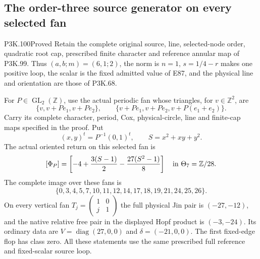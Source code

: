 \subsection{The order-three source generator on every selected fan}
\begin{statement}{P3K.100}{Proved}
Retain the complete original source, line, selected-node order,
quadratic root cap, prescribed finite character and reference annular map
of P3K.99. Thus \((a,b;m)=(6,1;2)\), the norm is \(n=1\),
\(s=1/4-r\) makes one positive loop, the scalar is the fixed admitted
value of E87, and the physical line and orientation are those of P3K.68.

For \(P\in\operatorname{GL}_2(\mathbb Z)\), use the actual periodic fan
whose triangles, for \(v\in\mathbb Z^2\), are
\[
 \{v,v+Pe_1,v+Pe_2\},\qquad
 \{v+Pe_1,v+Pe_2,v+P(e_1+e_2)\}.
\]
Carry its complete character, period, Cox, physical-circle, line and
finite-cap maps specified in the proof. Put
\[
 (x,y)^t=P^{-1}(0,1)^t,\qquad S=x^2+xy+y^2.
\]
The actual oriented return on this selected fan is
\[
 [\Phi_P]=\left[-4+\frac{3(S-1)}2-\frac{27(S^2-1)}8\right]
       \quad\hbox{in }\Theta_7=\mathbb Z/28.
\]
The complete image over these fans is
\[
 \{0,3,4,5,7,10,11,12,14,17,18,19,21,24,25,26\}.
\]
On every vertical fan \(T_j=\left(\begin{smallmatrix}1&0\\j&1\end{smallmatrix}\right)\)
the full physical Jin pair is \((-27,-12)\), and the native relative
free pair in the displayed Hopf product is \((-3,-24)\). Its ordinary
data are \(V=\operatorname{diag}(27,0,0)\) and
\(\delta=(-21,0,0)\). The first fixed-edge flop has class zero.
All these statements use the same prescribed full reference and
fixed-scalar source loop.
\end{statement}
